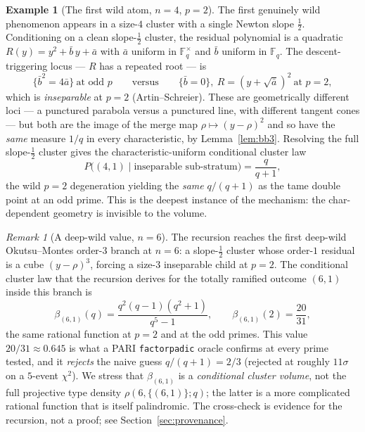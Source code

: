 \documentclass[pdflatex,sn-mathphys-num]{sn-jnl}%
\newcommand{\bbF}{\mathbb{F}}
\theoremstyle{plain}
\theoremstyle{definition}
\newtheorem{example}[theorem]{Example}
\theoremstyle{remark}
\newtheorem{remark}[theorem]{Remark}
\numberwithin{equation}{section}
\begin{document}
\begin{example}[The first wild atom, $n=4$, $p=2$]\label{ex:wild-atom}
The first genuinely wild phenomenon appears in a size-$4$ cluster with a single
Newton slope $\tfrac12$. Conditioning on a clean slope-$\tfrac12$ cluster, the
residual polynomial is a quadratic $R(y)=y^{2}+\bar b\,y+\bar a$ with $\bar a$
uniform in $\bbF_{q}^{\times}$ and $\bar b$ uniform in $\bbF_{q}$. The
descent-triggering locus --- $R$ has a repeated root --- is
\[
  \{\bar b^{2}=4\bar a\}\ \text{at odd }p
  \qquad\text{versus}\qquad
  \{\bar b=0\},\ R=(y+\sqrt{\bar a})^{2}\ \text{at }p=2,
\]
which is \emph{inseparable} at $p=2$ (Artin--Schreier). These are geometrically
different loci --- a punctured parabola versus a punctured line, with different
tangent cones --- but both are the image of the merge map $\rho\mapsto(y-\rho)^{2}$
and so have the \emph{same} measure $1/q$ in every characteristic, by
Lemma~\ref{lem:bb3}. Resolving the full slope-$\tfrac12$ cluster gives the
characteristic-uniform conditional cluster law
\[
  P\bigl((4,1)\mid\text{inseparable sub-stratum}\bigr)=\frac{q}{q+1},
\]
the wild $p=2$ degeneration yielding the \emph{same} $q/(q+1)$ as the tame double
point at an odd prime. This is the deepest instance of the mechanism: the
char-dependent geometry is invisible to the volume.
\end{example}

\begin{remark}[A deep-wild value, $n=6$]\label{rem:n6}
The recursion reaches the first deep-wild Okutsu--Montes order-$3$ branch at $n=6$:
a slope-$\tfrac12$ cluster whose order-$1$ residual is a cube $(y-\rho)^{3}$,
forcing a size-$3$ inseparable child at $p=2$. The conditional cluster law that
the recursion derives for the totally ramified outcome $(6,1)$ inside this branch
is
\[
  \beta_{(6,1)}(q)=\frac{q^{2}(q-1)(q^{2}+1)}{q^{5}-1},
  \qquad \beta_{(6,1)}(2)=\frac{20}{31},
\]
the same rational function at $p=2$ and at the odd primes. This value
$20/31\approx0.645$ is what a PARI \texttt{factorpadic} oracle confirms at every
prime tested, and it \emph{rejects} the naive guess $q/(q+1)=2/3$ (rejected at
roughly $11\sigma$ on a $5$-event $\chi^{2}$). We stress that $\beta_{(6,1)}$ is a
\emph{conditional cluster volume}, not the full projective type density
$\rho(6,\{(6,1)\};q)$; the latter is a more complicated rational function that is
itself palindromic. The cross-check is evidence for the recursion, not a proof;
see Section~\ref{sec:provenance}.
\end{remark}
\end{document}
